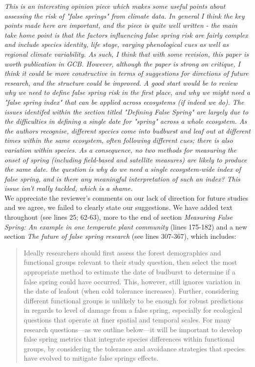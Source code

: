 \documentclass[11pt,a4paper]{article}
\begin{document}
\textit{This is an interesting opinion piece which makes some useful points about assessing the risk of "false springs" from climate data.  In general I think the key points made here are important, and the piece is quite well written - the main take home point is that the factors influencing false spring risk are fairly complex and include species identity, life stage, varying phenological cues as well as regional climate variability.  As such, I think that with some revision, this paper is worth publication in GCB. However, although the paper is strong on critique, I think it could be more constructive in terms of suggestions for directions of future research, and the structure could be improved.  A good start would be to review why we need to define false spring risk in the first place, and why we might need a "false spring index" that can be applied across ecosystems (if indeed we do).  The issues identifed within the section titled "Defining False Spring" are largely due to the difficulties in defining a single date for "spring" across a whole ecosystem.  As the authors recognise, different species come into budburst and leaf out at different times within the same ecosystem, often following different cues; there is also variation within species.  As a consequence, no two methods for measuring the onset of spring (including field-based and satellite measures) are likely to produce the same date.  the question is why do we need a single ecosystem-wide index of false spring, and is there any meaningful interpretation of such an index?  This issue isn't really tackled, which is a shame. } \\

We appreciate the reviewer's comments on our lack of direction for future studies and we agree, we failed to clearly state our suggestions. We have added text throughout (see lines 25; 62-63),  more to the end of section \textit{Measuring False Spring: An example in one temperate plant community} (lines 175-182) and a new section \textit{The future of false spring research} (see lines 307-367), which includes: \\ 

\begin{quotation}
Ideally researchers should first assess the forest demographics and functional groups relevant to their study question, then select the most appropriate method to estimate the date of budburst to determine if a false spring could have occurred. This, however, still ignores variation in the date of leafout (when cold tolerance increases). Further, considering different functional groups is unlikely to be enough for robust predictions in regards to level of damage from a false spring, especially for ecological questions that operate at finer spatial and temporal scales. For many research questions---as we outline below---it will be important to develop false spring metrics that integrate species differences within functional groups, by considering the tolerance and avoidance strategies that species have evolved to mitigate false springs effects.
\end{quotation} 
\end{document}
